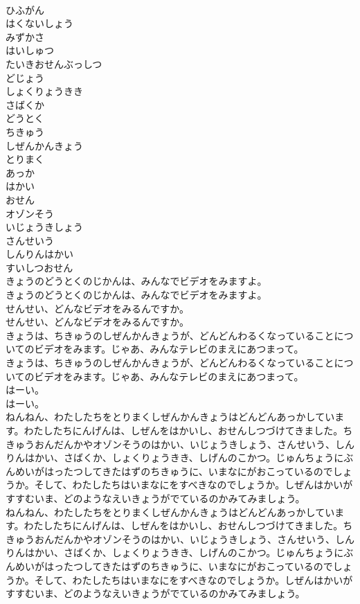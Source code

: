 \documentclass[8pt]{extreport}
\begin{document}
\begin{CJK}{UTF8}{min}
\\	ひふがん
\\	はくないしょう
\\	みずかさ
\\	はいしゅつ
\\	たいきおせんぶっしつ
\\	どじょう
\\	しょくりょうきき
\\	さばくか
\\	どうとく
\\	ちきゅう
\\	しぜんかんきょう
\\	とりまく
\\	あっか
\\	はかい
\\	おせん
\\	オゾンそう
\\	いじょうきしょう
\\	さんせいう
\\	しんりんはかい
\\	すいしつおせん
\\	きょうのどうとくのじかんは、みんなでビデオをみますよ。
\\	きょうのどうとくのじかんは、みんなでビデオをみますよ。
\\	せんせい、どんなビデオをみるんですか。
\\	せんせい、どんなビデオをみるんですか。
\\	きょうは、ちきゅうのしぜんかんきょうが、どんどんわるくなっていることについてのビデオをみます。じゃあ、みんなテレビのまえにあつまって。
\\	きょうは、ちきゅうのしぜんかんきょうが、どんどんわるくなっていることについてのビデオをみます。じゃあ、みんなテレビのまえにあつまって。
\\	はーい。
\\	はーい。
\\	ねんねん、わたしたちをとりまくしぜんかんきょうはどんどんあっかしています。わたしたちにんげんは、しぜんをはかいし、おせんしつづけてきました。ちきゅうおんだんかやオゾンそうのはかい、いじょうきしょう、さんせいう、しんりんはかい、さばくか、しょくりょうきき、しげんのこかつ。じゅんちょうにぶんめいがはったつしてきたはずのちきゅうに、いまなにがおこっているのでしょうか。そして、わたしたちはいまなにをすべきなのでしょうか。しぜんはかいがすすむいま、どのようなえいきょうがでているのかみてみましょう。
\\	ねんねん、わたしたちをとりまくしぜんかんきょうはどんどんあっかしています。わたしたちにんげんは、しぜんをはかいし、おせんしつづけてきました。ちきゅうおんだんかやオゾンそうのはかい、いじょうきしょう、さんせいう、しんりんはかい、さばくか、しょくりょうきき、しげんのこかつ。じゅんちょうにぶんめいがはったつしてきたはずのちきゅうに、いまなにがおこっているのでしょうか。そして、わたしたちはいまなにをすべきなのでしょうか。しぜんはかいがすすむいま、どのようなえいきょうがでているのかみてみましょう。

\end{CJK}
\end{document}
